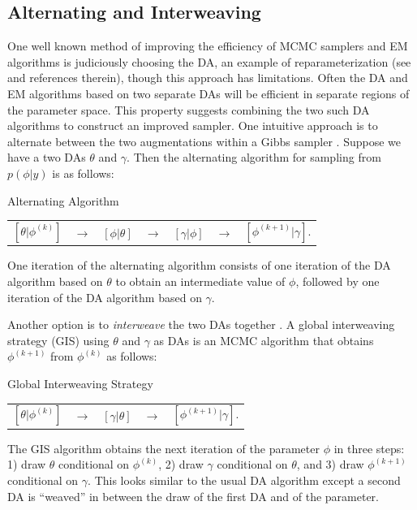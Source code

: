 \documentclass[12pt]{article}
\begin{document}
\subsection{Alternating and Interweaving}
One well known method of improving the efficiency of MCMC samplers and EM algorithms is judiciously choosing the DA, an example of reparameterization (see  \citet{papaspiliopoulos2007general} and references therein), though this approach has limitations. Often the DA and EM algorithms based on two separate DAs will be efficient in separate regions of the parameter space. This property suggests combining the two such DA algorithms to construct an improved sampler. One intuitive approach is to alternate between the two augmentations within a Gibbs sampler \citep{papaspiliopoulos2007general}. Suppose we have a two DAs $\theta$ and $\gamma$. Then the alternating algorithm for sampling from $p(\phi|y)$ is as follows:
\begin{alg*}[Alt]Alternating Algorithm\label{alg:Alt}
{\small
  \begin{center}
    \begin{tabular}{lllllll}
  $[\theta|\phi^{(k)}]$& $\to$& $[\phi|\theta]$& $\to$& $[\gamma|\phi]$& $\to$& $[\phi^{(k+1)}|\gamma]$.
    \end{tabular}
  \end{center}
}
\end{alg*}
\noindent One iteration of the alternating algorithm consists of one iteration of the DA algorithm based on $\theta$ to obtain an intermediate value of $\phi$, followed by one iteration of the DA algorithm based on $\gamma$. 

Another option is to {\it interweave} the two DAs together \citep{yu2011center}. A global interweaving strategy (GIS) using $\theta$ and $\gamma$ as DAs is an MCMC algorithm that obtains $\phi^{(k+1)}$ from $\phi^{(k)}$ as follows:
\begin{alg*}[GIS]Global Interweaving Strategy\label{alg:GIS}
{\small
\begin{center}
\begin{tabular}{lllll}
    $[\theta|\phi^{(k)}]$ & $\to$& $[\gamma|\theta]$& $\to$& $[\phi^{(k+1)}|\gamma]$.
\end{tabular}
\end{center}
}
\end{alg*}
\noindent The GIS algorithm obtains the next iteration of the parameter $\phi$ in three steps: 1) draw $\theta$ conditional on $\phi^{(k)}$, 2) draw $\gamma$ conditional on $\theta$, and 3) draw $\phi^{(k+1)}$ conditional on $\gamma$. This looks similar to the usual DA algorithm except a second DA is ``weaved'' in between the draw of the first DA and of the parameter. 
\end{document}
